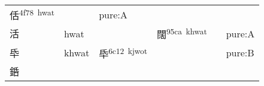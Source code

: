 \documentclass[14pt,a4paper]{scrartcl}
\begin{document}
\begin{longtable}[c]{@{}llllll@{}}
\begin{minipage}[t]{0.14\columnwidth}
佸\textsuperscript{4f78~hwat}
\strut\end{minipage} &
\begin{minipage}[t]{0.14\columnwidth}\raggedright\strut
\strut\end{minipage} &
\begin{minipage}[t]{0.14\columnwidth}\raggedright\strut
pure:A
\strut\end{minipage}\tabularnewline
\begin{minipage}[t]{0.14\columnwidth}\raggedright\strut
活
\strut\end{minipage} &
\begin{minipage}[t]{0.14\columnwidth}\raggedright\strut
hwat
\strut\end{minipage} &
\begin{minipage}[t]{0.14\columnwidth}\raggedright\strut
\strut\end{minipage} &
\begin{minipage}[t]{0.14\columnwidth}\raggedright\strut
闊\textsuperscript{95ca~khwat}
\strut\end{minipage} &
\begin{minipage}[t]{0.14\columnwidth}\raggedright\strut
\strut\end{minipage} &
\begin{minipage}[t]{0.14\columnwidth}\raggedright\strut
pure:A
\strut\end{minipage}\tabularnewline
\begin{minipage}[t]{0.14\columnwidth}\raggedright\strut
氒
\strut\end{minipage} &
\begin{minipage}[t]{0.14\columnwidth}\raggedright\strut
khwat
\strut\end{minipage} &
\begin{minipage}[t]{0.14\columnwidth}\raggedright\strut
氒\textsuperscript{6c12~kjwot}
\strut\end{minipage} &
\begin{minipage}[t]{0.14\columnwidth}\raggedright\strut
\strut\end{minipage} &
\begin{minipage}[t]{0.14\columnwidth}\raggedright\strut
\strut\end{minipage} &
\begin{minipage}[t]{0.14\columnwidth}\raggedright\strut
pure:B
\strut\end{minipage}\tabularnewline
\begin{minipage}[t]{0.14\columnwidth}\raggedright\strut
銽
\strut\end{minipage} &

\end{longtable}
\end{document}
